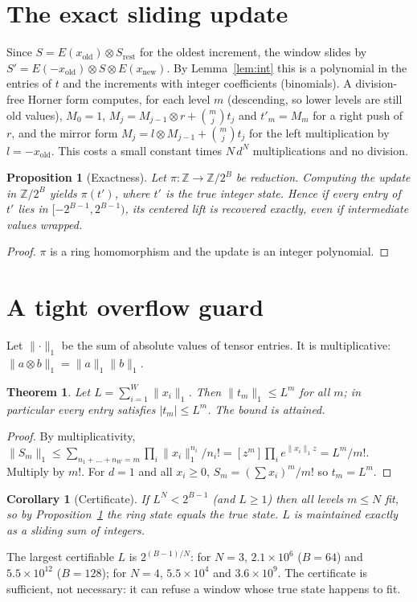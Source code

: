 \documentclass[11pt]{article}
\newtheorem{theorem}{Theorem}
\newtheorem{proposition}{Proposition}
\newtheorem{corollary}{Corollary}
\theoremstyle{remark}\newtheorem{remark}{Remark}
\newcommand{\Z}{\mathbb{Z}}
\newcommand{\norm}[1]{\lVert #1\rVert_1}
\begin{document}
\section{The exact sliding update}\label{sec:update}
Since $S=E(x_{\mathrm{old}})\otimes S_{\mathrm{rest}}$ for the oldest increment, the window slides by $S'=E(-x_{\mathrm{old}})\otimes S\otimes E(x_{\mathrm{new}})$. By Lemma~\ref{lem:int} this is a polynomial in the entries of $t$ and the increments with integer coefficients (binomials). A division-free Horner form computes, for each level $m$ (descending, so lower levels are still old values), $M_0=1$, $M_j=M_{j-1}\otimes r+\binom mj t_j$ and $t'_m=M_m$ for a right push of $r$, and the mirror form $M_j=l\otimes M_{j-1}+\binom mj t_j$ for the left multiplication by $l=-x_{\mathrm{old}}$. This costs a small constant times $N\,d^N$ multiplications and no division.

\begin{proposition}[Exactness]\label{prop:exact}
Let $\pi:\Z\to\Z/2^B$ be reduction. Computing the update in $\Z/2^B$ yields $\pi(t')$, where $t'$ is the true integer state. Hence if every entry of $t'$ lies in $[-2^{B-1},2^{B-1})$, its centered lift is recovered exactly, even if intermediate values wrapped.
\end{proposition}
\begin{proof}
$\pi$ is a ring homomorphism and the update is an integer polynomial.
\end{proof}

\section{A tight overflow guard}\label{sec:guard}
Let $\norm{\cdot}$ be the sum of absolute values of tensor entries. It is multiplicative: $\norm{a\otimes b}=\norm a\norm b$.

\begin{theorem}\label{thm:guard}
Let $L=\sum_{i=1}^W\norm{x_i}$. Then $\norm{t_m}\le L^m$ for all $m$; in particular every entry satisfies $|t_m|\le L^m$. The bound is attained.
\end{theorem}
\begin{proof}
By multiplicativity, $\norm{S_m}\le\sum_{n_1+\dots+n_W=m}\prod_i\norm{x_i}^{n_i}/n_i!=[z^m]\prod_i e^{\norm{x_i}z}=L^m/m!$. Multiply by $m!$. For $d=1$ and all $x_i\ge0$, $S_m=(\sum x_i)^m/m!$ so $t_m=L^m$.
\end{proof}
\begin{corollary}[Certificate]
If $L^N<2^{B-1}$ (and $L\ge1$) then all levels $m\le N$ fit, so by Proposition~\ref{prop:exact} the ring state equals the true state. $L$ is maintained exactly as a sliding sum of integers.
\end{corollary}
The largest certifiable $L$ is $2^{(B-1)/N}$: for $N=3$, $2.1\times10^6$ ($B=64$) and $5.5\times10^{12}$ ($B=128$); for $N=4$, $5.5\times10^4$ and $3.6\times10^9$. The certificate is sufficient, not necessary: it can refuse a window whose true state happens to fit.
\end{document}
